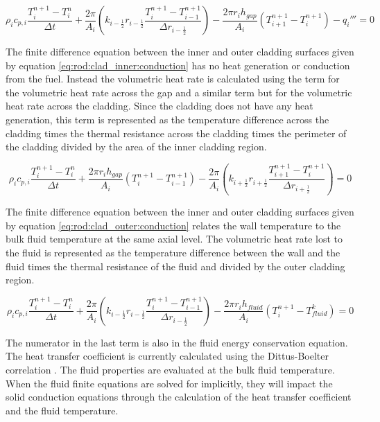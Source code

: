 \begin{equation}
	\label{eq:rod:fuel_surface:conduction}
	  \rho_{i}c_{p,i}\frac{T^{n+1}_{i}-T^{n}_{i}}{\Delta t}
	+ \frac{2\pi}{A_{i}}
 	    \left(k_{i-\frac{1}{2}}r_{i-\frac{1}{2}}
		\frac{T^{n+1}_{i}-T^{n+1}_{i-1}}{\Delta r_{i-\frac{1}{2}}}\right)
	- \frac{2\pi r_{i}h_{gap}}{A_{i}}\left(T^{n+1}_{i+1}-T^{n+1}_{i}\right)
	- q_{i}'''
	= 0
\end{equation}

The finite difference equation between the inner and outer cladding surfaces
given by equation \ref{eq:rod:clad_inner:conduction} has no heat generation or
conduction from the fuel. Instead the  volumetric heat rate is calculated using
the term for the volumetric heat rate  across the gap and a similar term but for
the volumetric heat rate across the cladding. Since the cladding does not have
any heat generation, this  term is represented as the temperature difference
across the cladding times the thermal resistance across the cladding  times the
perimeter of the cladding divided by the area of the inner cladding region.

\begin{equation}
	\label{eq:rod:clad_inner:conduction}
	  \rho_{i}c_{p,i}\frac{T^{n+1}_{i}-T^{n}_{i}}{\Delta t}
	+ \frac{2\pi r_{i}h_{gap}}{A_{i}}\left(T^{n+1}_{i}-T^{n+1}_{i-1}\right)
	- \frac{2\pi}{A_{i}}
 	    \left(k_{i+\frac{1}{2}}r_{i+\frac{1}{2}}
		\frac{T^{n+1}_{i+1}-T^{n+1}_{i}}{\Delta r_{i+\frac{1}{2}}}\right)
	= 0
\end{equation}

The finite difference equation between the inner and outer cladding surfaces
given by equation \ref{eq:rod:clad_outer:conduction} relates the wall
temperature to the bulk fluid temperature at the same axial level. The
volumetric heat rate lost to the fluid is represented as the temperature
difference between the wall and the fluid times the thermal resistance of the
fluid and divided by the outer cladding region.

\begin{equation}
	\label{eq:rod:clad_outer:conduction}
	  \rho_{i}c_{p,i}\frac{T^{n+1}_{i}-T^{n}_{i}}{\Delta t}
	+ \frac{2\pi}{A_{i}}
 	    \left(k_{i-\frac{1}{2}}r_{i-\frac{1}{2}}
		\frac{T^{n+1}_{i}-T^{n+1}_{i-1}}{\Delta r_{i-\frac{1}{2}}}\right)
    - \frac{2\pi r_{i}h_{fluid}}{A_{i}}\left(T^{n+1}_{i}-T^{k}_{fluid}\right)
	= 0
\end{equation}

The numerator in the last term is also in the fluid energy conservation
equation. The heat transfer coefficient is currently calculated using the
Dittus-Boelter correlation \cite{Incropera1998}. The fluid properties are
evaluated at the bulk fluid temperature. When the fluid finite equations are
solved for implicitly, they will impact the solid conduction equations through
the calculation of the heat transfer coefficient and the fluid temperature.